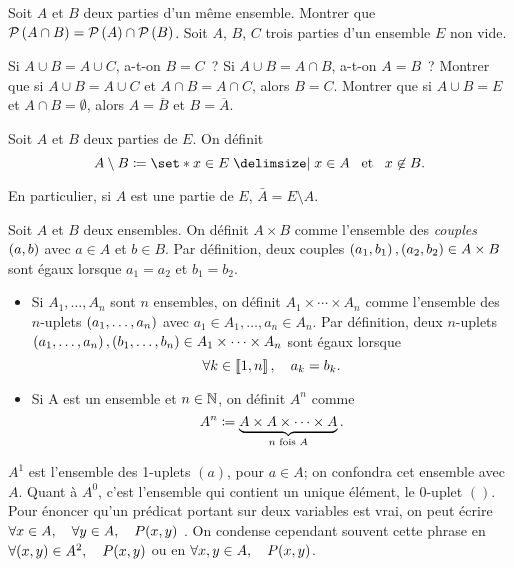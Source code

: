 \documentclass{magnolia}
\begin{document}
\begin{exos}
\exo Soit $A$ et $B$ deux parties d'un même ensemble. Montrer que
  $\mathcal{P}\left(A\cap B\right)=\mathcal{P}\left(A\right)\cap\mathcal{P}\left(B\right)$.
\exo Soit $A$, $B$, $C$ trois parties d'un ensemble $E$ non vide.
  \begin{questions}
  \question Si $A\cup B=A\cup C$, a-t-on $B=C$~?
  \question Si $A\cup B=A\cap B$, a-t-on $A=B$~?
  \question Montrer que si $A\cup B=A\cup C$ et $A\cap B=A\cap C$, alors $B=C$.
  \question Montrer que si $A\cup B=E$ et $A\cap B=\emptyset$, alors $A=\overline{B}$ et
  $B=\overline{A}$.
  \end{questions}
\end{exos}

\begin{definition}[utile=-3]
Soit $A$ et $B$ deux parties de $E$. On définit
\[A\setminus B\defeq\enstq{x\in E}{x\in A \et x\not\in B}.\]
\end{definition}

\begin{remarqueUnique}
\remarque En particulier, si $A$ est une partie de $E$, $\bar{A}=E\setminus A$.
\end{remarqueUnique}

\begin{definition}
Soit $A$ et $B$ deux ensembles. On définit $A\times B$ comme l'ensemble
des \emph{couples} $\left(a,b\right)$ avec $a\in A$ et $b\in B$. Par définition, deux couples
$\left(a_1,b_1\right), \left(a_2,b_2\right)\in A\times B$ sont égaux lorsque $a_1=a_2$ et $b_1=b_2$.
\end{definition}

\begin{definition}[utile=-3]
\begin{itemize}
\item Si $A_1,\ldots,A_n$ sont $n$ ensembles, on définit
  $A_1\times\cdots\times A_n$ comme l'ensemble des $n$-uplets
  $\left(a_1,\ldots,a_n\right)$ avec $a_1\in A_1,\ldots,a_n\in A_n$. Par définition, deux $n$-uplets
  $\left(a_1,\ldots,a_n\right), \left(b_1,\ldots,b_n\right)\in A_1\times\cdots\times A_n$ sont égaux lorsque
  \[\forall k\in\left\llbracket 1,n\right\rrbracket ,\quad a_k=b_k.\]
\item Si A est un ensemble et $n\in\mathbb{N}$, on définit $A^n$ comme
  \[A^n\coloneqq\underbrace{A\times A\times\cdots\times A}_{\text{$n$ fois $A$}}.\]
\end{itemize}
\end{definition}

\begin{remarques}
\remarque $A^1$ est l'ensemble des 1-uplets $(a)$, pour $a\in A$; on confondra cet
  ensemble avec $A$. Quant à $A^0$, c'est l'ensemble qui contient un unique élément,
  le $0$-uplet $()$.
\remarque Pour énoncer qu'un prédicat portant sur deux variables est vrai, on peut écrire
  \og $\forall x\in A,\quad \forall y\in A,\quad P(x,y)$ \fg.
  On condense cependant souvent cette phrase en \og $\forall (x,y)\in A^2,\quad P(x,y)$ \fg ou
  en \og $\forall x,y\in A,\quad P(x,y)$\fg.
\end{remarques}
\end{document}
